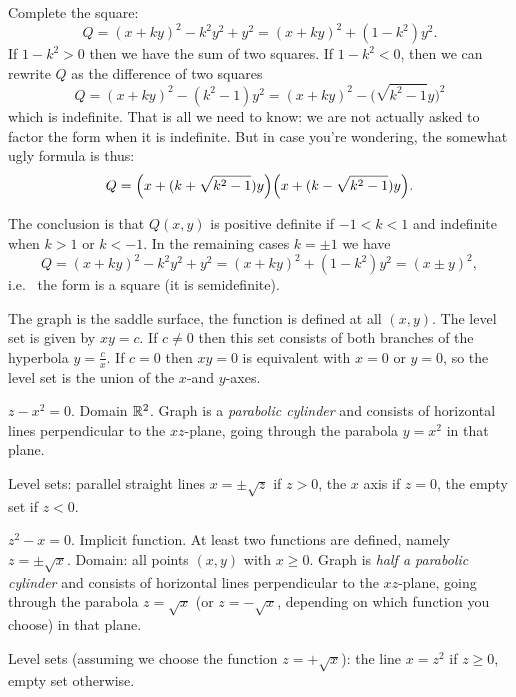 \item[{\bfseries(III5.6)}]

Complete the square:
\[
  Q=(x+ky)^2 - k^2 y^2 + y^2
   =(x+ky)^2 + (1- k^2) y^2.
\]
If $1-k^2>0$ then we have the sum of two squares.  If $1-k^2<0$, then we can rewrite
$Q$ as the difference of two squares
\[
   Q=(x+ky)^2 - (k^2-1) y^2
   =(x+ky)^2 - \bigl(\sqrt{k^2-1}y\bigr)^2
\]
which is indefinite.  That is all we need to know: we are not actually asked to
factor the form when it is indefinite.  But in case you're wondering, the somewhat
ugly formula is thus:
\[
  Q = \Bigl(x+(k+\sqrt{k^2-1}) y\Bigr) \Bigl(x+(k-\sqrt{k^2-1}) y\Bigr).
\]

The conclusion is that $Q(x,y)$ is positive definite if $-1<k<1$ and indefinite when
$k>1$ or $k<-1$.  In the remaining cases $k=\pm1$ we have
\[
  Q=(x+ky)^2 - k^2 y^2 + y^2
   =(x+ky)^2 + (1- k^2) y^2 = (x\pm y)^2,
\]
i.e.~ the form is a square (it is semidefinite).
\bigskip

\item[{\bfseries(III5.7a)}]

The graph is the saddle surface, the function is defined at all $(x,y)$.  The level
set is given by $xy = c$.  If $c\ne 0$ then this set consists of both branches of the
hyperbola $y=\frac{c}{x}$.  If $c=0$ then $xy=0$ is equivalent with $x=0$ or $y=0$,
so the level set is the union of the $x$-and $y$-axes.
\bigskip

\item[{\bfseries(III5.7b)}]

$z-x^2=0$.
Domain $\mathbb{R}^2$.  Graph is a \emph{parabolic cylinder} and consists of
horizontal lines perpendicular to the $xz$-plane, going through the
parabola $y=x^2$ in that plane.

Level sets: parallel straight lines $x=\pm\sqrt{z}$ if $z>0$,
the $x$ axis if $z=0$, the empty set if $z<0$.
\bigskip

\item[{\bfseries(III5.7c)}]

$z^2-x=0$.
Implicit function.
At least two functions are defined, namely $z=\pm \sqrt{x}$.
Domain: all points $(x,y)$ with $x\ge 0$.
Graph is \emph{half a parabolic cylinder} and consists of
horizontal lines perpendicular to the $xz$-plane, going through the
parabola $z=\sqrt x$ (or $z=-\sqrt x$, depending on which function
you choose) in that plane.

Level sets (assuming we choose the function $z=+\sqrt{x}$):
the line $x=z^2$ if $z\ge0$, empty set otherwise.
\bigskip

